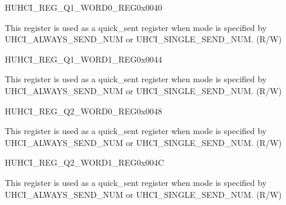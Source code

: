 \begin{register}{H}{UHCI\_REG\_Q1\_WORD0\_REG}{0x{}0040}\label{regdesc:UHCIREGQ1WORD0REG}
%
\regnewline%
\begin{regdesc}\begin{reglist}
\label{fielddesc:UHCISENDQ1WORD0}\item [UHCI\_SEND\_Q1\_WORD0] This register is used as a quick\_sent register when mode is specified by UHCI\_ALWAYS\_SEND\_NUM or UHCI\_SINGLE\_SEND\_NUM. (R/W)
\end{reglist}\end{regdesc}
\end{register}


\begin{register}{H}{UHCI\_REG\_Q1\_WORD1\_REG}{0x{}0044}\label{regdesc:UHCIREGQ1WORD1REG}
%
\regnewline%
\begin{regdesc}\begin{reglist}
\label{fielddesc:UHCISENDQ1WORD1}\item [UHCI\_SEND\_Q1\_WORD1] This register is used as a quick\_sent register when mode is specified by UHCI\_ALWAYS\_SEND\_NUM or UHCI\_SINGLE\_SEND\_NUM. (R/W)
\end{reglist}\end{regdesc}
\end{register}


\begin{register}{H}{UHCI\_REG\_Q2\_WORD0\_REG}{0x{}0048}\label{regdesc:UHCIREGQ2WORD0REG}
%
\regnewline%
\begin{regdesc}\begin{reglist}
\label{fielddesc:UHCISENDQ2WORD0}\item [UHCI\_SEND\_Q2\_WORD0] This register is used as a quick\_sent register when mode is specified by UHCI\_ALWAYS\_SEND\_NUM or UHCI\_SINGLE\_SEND\_NUM. (R/W)
\end{reglist}\end{regdesc}
\end{register}


\begin{register}{H}{UHCI\_REG\_Q2\_WORD1\_REG}{0x{}004C}\label{regdesc:UHCIREGQ2WORD1REG}
%
\regnewline%
\begin{regdesc}\begin{reglist}
\label{fielddesc:UHCISENDQ2WORD1}\item [UHCI\_SEND\_Q2\_WORD1] This register is used as a quick\_sent register when mode is specified by UHCI\_ALWAYS\_SEND\_NUM or UHCI\_SINGLE\_SEND\_NUM. (R/W)
\end{reglist}\end{regdesc}
\end{register}


